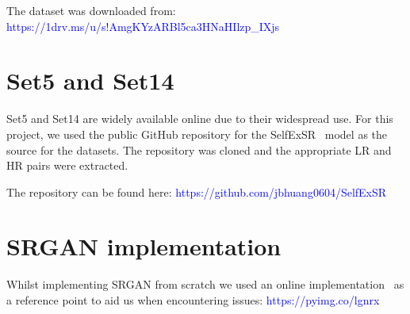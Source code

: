\begin{appendices}
The dataset was downloaded from: \textcolor{blue}{https://1drv.ms/u/s!AmgKYzARBl5ca3HNaHIlzp\_IXjs}

\section{Set5 and Set14}
Set5 and Set14 are widely available online due to their widespread use. For this project, we used the public GitHub repository for the SelfExSR~\cite{selfexsr} model as the source for the datasets. The repository was cloned and the appropriate LR and HR pairs were extracted.

The repository can be found here: \textcolor{blue}{https://github.com/jbhuang0604/SelfExSR}

\section{SRGAN implementation}
Whilst implementing SRGAN from scratch we used an online implementation~\cite{srganImplementation} as a reference point to aid us when encountering issues: \textcolor{blue}{https://pyimg.co/lgnrx}


\end{appendices}
